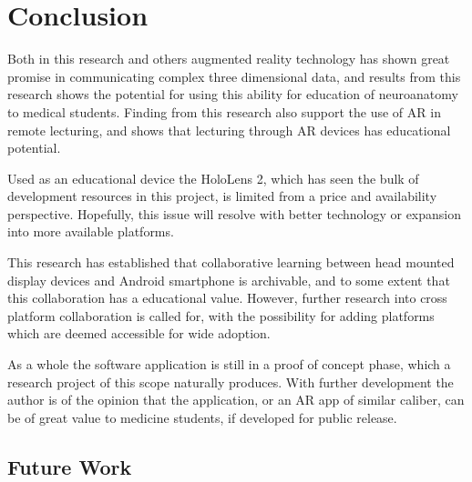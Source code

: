 \chapter{Conclusion}

Both in this research and others augmented reality technology has shown great promise in communicating complex three dimensional data, and results from this research shows the potential for using this ability for education of neuroanatomy to medical students. Finding from this research also support the use of AR in remote lecturing, and shows that lecturing through AR devices has educational potential.

Used as an educational device the HoloLens 2, which has seen the bulk of development resources in this project, is limited from a price and availability perspective. Hopefully, this issue will resolve with better technology or expansion into more available platforms.

This research has established that collaborative learning between head mounted display devices and Android smartphone is archivable, and to some extent that this collaboration has a educational value. However, further research into cross platform collaboration is called for, with the possibility for adding platforms which are deemed accessible for wide adoption.

As a whole the software application is still in a proof of concept phase, which a research project of this scope naturally produces. With further development the author is of the opinion that the application, or an AR app of similar caliber, can be of great value to medicine students, if developed for public release.




\section{Future Work}





